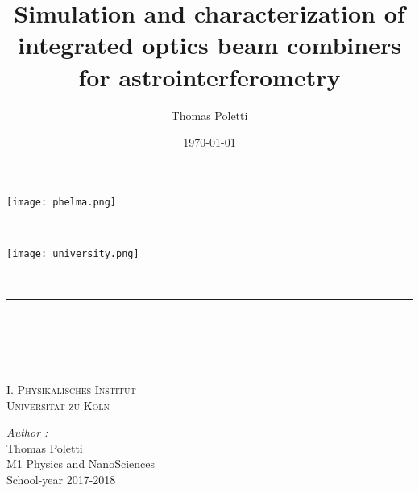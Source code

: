 \documentclass[a4paper,twoside,11pt]{article}
\title{Simulation and characterization of integrated optics beam combiners for astrointerferometry}								%
\author{Thomas Poletti}								%
\date{\today}											%
\makeatletter
\let\thetitle\@title
\makeatother
\begin{document}

\begin{titlepage}

	\begin{minipage}{0.5\textwidth}
		\begin{flushleft} 
    \texttt{[image: phelma.png]}\\[1.0 cm]	%
			\end{flushleft}
			\end{minipage}~
			\begin{minipage}{0.5\textwidth}
            
			\begin{flushright} 
    
    \texttt{[image: university.png]}\\[1.0 cm]	%
		\end{flushright}
        
	\end{minipage}\\[3 cm]
	
    \centering
    \vspace*{0.5 cm}
	\rule{\linewidth}{0.2 mm} \\[0.4 cm]
	{ \huge \bfseries \thetitle}\\
	\rule{\linewidth}{0.2 mm} \\[1.5 cm]
    \textsc{\Large I. Physikalisches Institut \\
Universität zu Köln}\\[5 cm]	%

	
	\begin{minipage}{0.4\textwidth}
		\begin{flushleft} \large
			\emph{Author :} \\
			Thomas Poletti\\
          M1 Physics and NanoSciences\\
          School-year 2017-2018\\
			\end{flushleft}
			\end{minipage}~
			\begin{minipage}{0.4\textwidth}
            

\end{minipage}
\end{titlepage}
\end{document}
